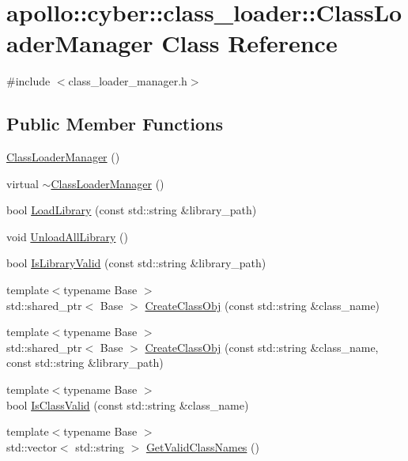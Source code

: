 \hypertarget{classapollo_1_1cyber_1_1class__loader_1_1ClassLoaderManager}{\section{apollo\-:\-:cyber\-:\-:class\-\_\-loader\-:\-:Class\-Loader\-Manager Class Reference}
\label{classapollo_1_1cyber_1_1class__loader_1_1ClassLoaderManager}
}


{\ttfamily \#include $<$class\-\_\-loader\-\_\-manager.\-h$>$}

\subsection*{Public Member Functions}
\begin{DoxyCompactItemize}
\item 
\hyperlink{classapollo_1_1cyber_1_1class__loader_1_1ClassLoaderManager_ae67511bbe6bee61a082c339a53532ca8}{Class\-Loader\-Manager} ()
\item 
virtual \hyperlink{classapollo_1_1cyber_1_1class__loader_1_1ClassLoaderManager_aea360adf2529cb95b9590b7c1565a3e9}{$\sim$\-Class\-Loader\-Manager} ()
\item 
bool \hyperlink{classapollo_1_1cyber_1_1class__loader_1_1ClassLoaderManager_a9953c5cfabd0852891dcb6699d8e3dd1}{Load\-Library} (const std\-::string \&library\-\_\-path)
\item 
void \hyperlink{classapollo_1_1cyber_1_1class__loader_1_1ClassLoaderManager_a73f7454c0410084137a927ad49b75104}{Unload\-All\-Library} ()
\item 
bool \hyperlink{classapollo_1_1cyber_1_1class__loader_1_1ClassLoaderManager_a62b76f761a0e500f93f075387300eccb}{Is\-Library\-Valid} (const std\-::string \&library\-\_\-path)
\item 
{\footnotesize template$<$typename Base $>$ }\\std\-::shared\-\_\-ptr$<$ Base $>$ \hyperlink{classapollo_1_1cyber_1_1class__loader_1_1ClassLoaderManager_a9679e70f73c8215e99fb1ecc7fa10043}{Create\-Class\-Obj} (const std\-::string \&class\-\_\-name)
\item 
{\footnotesize template$<$typename Base $>$ }\\std\-::shared\-\_\-ptr$<$ Base $>$ \hyperlink{classapollo_1_1cyber_1_1class__loader_1_1ClassLoaderManager_a3f52ab9d057116be16cd2dc92efa48f5}{Create\-Class\-Obj} (const std\-::string \&class\-\_\-name, const std\-::string \&library\-\_\-path)
\item 
{\footnotesize template$<$typename Base $>$ }\\bool \hyperlink{classapollo_1_1cyber_1_1class__loader_1_1ClassLoaderManager_a4bd67245e45cf40d99681139fb48d04f}{Is\-Class\-Valid} (const std\-::string \&class\-\_\-name)
\item 
{\footnotesize template$<$typename Base $>$ }\\std\-::vector$<$ std\-::string $>$ \hyperlink{classapollo_1_1cyber_1_1class__loader_1_1ClassLoaderManager_ab75b7537616bf990a4b0008fac17bb69}{Get\-Valid\-Class\-Names} ()
\end{DoxyCompactItemize}
